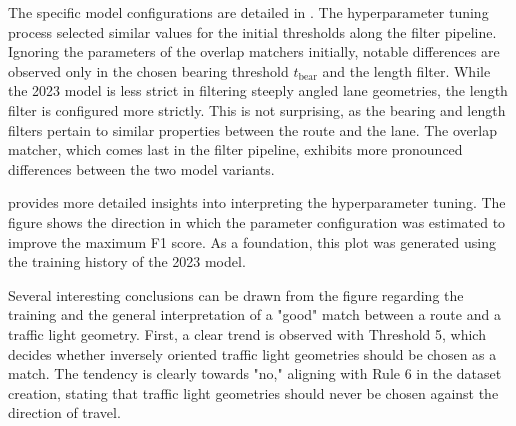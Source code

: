 \begin{table}[t]
\caption{Tuned hyperparameters for the algorithmic matching model. The parameter identifiers were explained further in .}
\label{tab:hyperparameter-tuning-results}
\end{table}

The specific model configurations are detailed in . The hyperparameter tuning process selected similar values for the initial thresholds along the filter pipeline. Ignoring the parameters of the overlap matchers initially, notable differences are observed only in the chosen bearing threshold $t_{\text{bear}}$ and the length filter. While the 2023 model is less strict in filtering steeply angled lane geometries, the length filter is configured more strictly. This is not surprising, as the bearing and length filters pertain to similar properties between the route and the lane. The overlap matcher, which comes last in the filter pipeline, exhibits more pronounced differences between the two model variants. 

 provides more detailed insights into interpreting the hyperparameter tuning. The figure shows the direction in which the parameter configuration was estimated to improve the maximum F1 score. As a foundation, this plot was generated using the training history of the 2023 model.

Several interesting conclusions can be drawn from the figure regarding the training and the general interpretation of a "good" match between a route and a traffic light geometry. First, a clear trend is observed with Threshold 5, which decides whether inversely oriented traffic light geometries should be chosen as a match. The tendency is clearly towards "no," aligning with Rule 6 in the dataset creation, stating that traffic light geometries should never be chosen against the direction of travel. 

